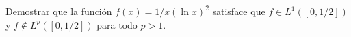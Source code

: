 \documentclass{book}
\newcommand{\rr}{\mathbb{R}}
\begin{document}


 \begin{ejer}{}
  Demostrar que la función $f(x)=1 /x(\ln x)^2 $ satisface que $f\in L^1([0,1/2])$ y $f\notin L^p([0,1/2])$ para todo $p>1$.
  \end{ejer}
 

\end{document}
